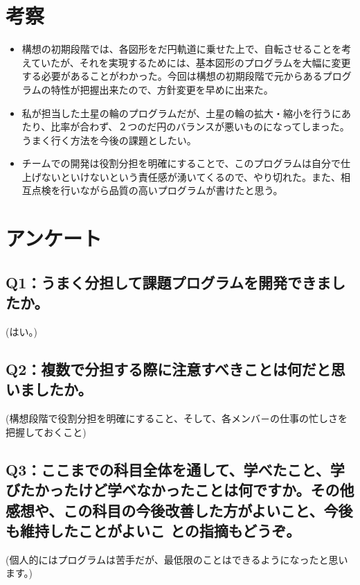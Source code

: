 \documentclass[12pt,a4j]{jarticle}
\begin{document}
\section{考察}
\begin{itemize}
  \item 構想の初期段階では、各図形をだ円軌道に乗せた上で、自転させることを考えていたが、それを実現するためには、基本図形のプログラムを大幅に変更する必要があることがわかった。今回は構想の初期段階で元からあるプログラムの特性が把握出来たので、方針変更を早めに出来た。
  \item 私が担当した土星の輪のプログラムだが、土星の輪の拡大・縮小を行うにあたり、比率が合わず、２つのだ円のバランスが悪いものになってしまった。うまく行く方法を今後の課題としたい。
  \item チームでの開発は役割分担を明確にすることで、このプログラムは自分で仕上げないといけないという責任感が湧いてくるので、やり切れた。また、相互点検を行いながら品質の高いプログラムが書けたと思う。
\end{itemize}

\section{アンケート}

\subsection{Q1：うまく分担して課題プログラムを開発できましたか。}

(はい。)

\subsection{Q2：複数で分担する際に注意すべきことは何だと思いましたか。}

(構想段階で役割分担を明確にすること、そして、各メンバ－の仕事の忙しさを把握しておくこと)

\subsection{Q3：ここまでの科目全体を通して、学べたこと、学びたかったけど学べなかったことは何ですか。その他感想や、この科目の今後改善した方がよいこと、今後も維持したことがよいこ との指摘もどうぞ。}

(個人的にはプログラムは苦手だが、最低限のことはできるようになったと思います。)
\end{document}
